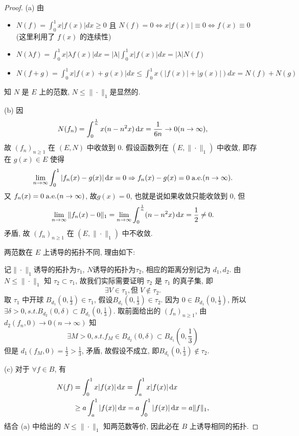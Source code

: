 \begin{proof}
(a) 由
\begin{itemize}
\item $N(f)=\int_0^1x|f(x)|dx\geq 0$ 且 $N(f)=0\Leftrightarrow x|f(x)|\equiv 0\Leftrightarrow f(x)\equiv 0$ (这里利用了 $f(x)$ 的连续性)
\item $N(\lambda f)=\int_0^1x|\lambda f(x)|dx=|\lambda|\int_0^1x|f(x)|dx=|\lambda|N(f)$
\item $N(f+g)=\int_0^1x|f(x)+g(x)|dx\leq \int_0^1x(|f(x)|+|g(x)|)dx=N(f)+N(g)$
\end{itemize}
知 $N$ 是 $E$ 上的范数, $N\leq\|\cdot\|_1$是显然的.

(b) 因
\[N(f_n)=\int_0^{\frac{1}{n}}x(n-n^2x)\mathop{}\!\mathrm{d} x=\frac{1}{6n}\rightarrow 0(n\to\infty),\]
故 $(f_n)_{n\geq 1}$ 在 $(E,N)$ 中收敛到 $0$. 
假设函数列在 $(E,\|\cdot\|_1)$ 中收敛, 即存在 $g(x)\in E$ 使得
\[\lim_{n\to\infty}\int_0^1|f_n(x)-g(x)|\mathop{}\!\mathrm{d} x=0\Rightarrow f_n(x)-g(x)=0\;\mathrm{a.e.}(n\to\infty).\]
又 $f_n(x)=0\;\mathrm{a.e.} (n\to\infty)$, 故$g(x)=0$, 也就是说如果收敛只能收敛到 0, 但
\[\lim_{n\to\infty}\|f_n(x)-0\|_1=\lim_{n\to\infty}\int_0^{\frac{1}{n}}(n-n^2x)\mathop{}\!\mathrm{d} x=\frac{1}{2}\neq 0.\]
矛盾, 故 $(f_n)_{n\geq 1}$ 在 $(E,\|\cdot\|_1)$ 中不收敛.

两范数在 $E$ 上诱导的拓扑不同, 理由如下:

记$\|\cdot\|_1$诱导的拓扑为$\tau_1$, $N$诱导的拓扑为$\tau_2$, 
相应的距离分别记为 $d_1,d_2$. 
由 $N\leq \|\cdot\|_1$ 知 $\tau_2\subset\tau_1$, 
故我们实际需要证明 $\tau_2$ 是 $\tau_1$ 的真子集, 即
\[\exists V\in\tau_1,\text{但}\;V\notin\tau_2.\]
取 $\tau_1$ 中开球 $B_{d_1}(0,\frac{1}{3})\in\tau_1$,
假设$B_{d_1}(0,\frac{1}{3})\in\tau_2$. 因为 $0\in B_{d_1}(0,\frac{1}{3})$, 
所以 $\exists\delta>0,s.t.B_{d_2}(0,\delta)\subset B_{d_1}(0,\frac{1}{3})$.
取前面给出的 $(f_n)_{n\geq 1}$, 由$d_2(f_n,0)\to 0(n\to\infty)$ 知
\[\exists M>0,s.t.f_M\in B_{d_2}(0,\delta)\subset B_{d_1}(0,\frac{1}{3})\]
但是 $d_1(f_M,0)=\frac{1}{2}>\frac{1}{3}$, 矛盾, 故假设不成立, 即$B_{d_1}(0,\frac{1}{3})\notin\tau_2$.

(c) 对于 $\forall f\in B$, 有 
\begin{align*}
    N(f) & =\int_0^1x|f(x)|\mathop{}\!\mathrm{d} x=\int_a^1 x|f(x)|\mathop{}\!\mathrm{d} x \\
         & \geq a\int_a^1|f(x)|\mathop{}\!\mathrm{d} x=a\int_0^1|f(x)|\mathop{}\!\mathrm{d} x=a\|f\|_1,
\end{align*} 
结合 (a) 中给出的 $N\leq\|\cdot\|_1$ 知两范数等价, 因此必在 $B$ 上诱导相同的拓扑.
\end{proof}


